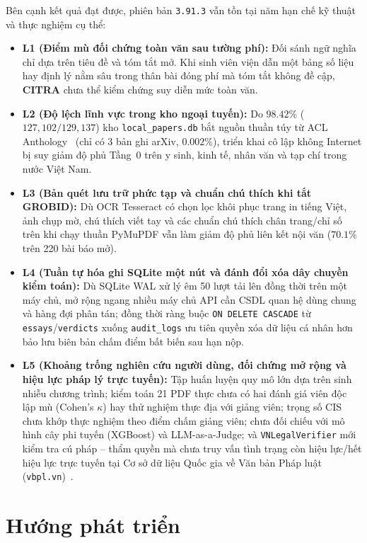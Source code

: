 Bên cạnh kết quả đạt được, phiên bản \texttt{3.91.3} vẫn tồn tại năm hạn chế kỹ thuật và thực nghiệm cụ thể:
{\setlength{\itemsep}{0pt}\setlength{\parskip}{0pt}
\begin{itemize}
    \item \textbf{L1 (Điểm mù đối chứng toàn văn sau tường phí):} Đối sánh ngữ nghĩa chỉ dựa trên tiêu đề và tóm tắt mở. Khi sinh viên viện dẫn một bảng số liệu hay định lý nằm sâu trong thân bài đóng phí mà tóm tắt không đề cập, \textbf{CITRA} chưa thể kiểm chứng suy diễn mức toàn văn.
    \item \textbf{L2 (Độ lệch lĩnh vực trong kho ngoại tuyến):} Do $98.42\%$ ($127{,}102 / 129{,}137$) kho \texttt{local\_papers.db} bắt nguồn thuần túy từ ACL Anthology~\cite{acl-anthology} (chỉ có 3 bản ghi arXiv, $0.002\%$), triển khai cô lập không Internet bị suy giảm độ phủ Tầng~0 trên y sinh, kinh tế, nhân văn và tạp chí trong nước Việt Nam.
    \item \textbf{L3 (Bản quét lưu trữ phức tạp và chuẩn chú thích khi tắt GROBID):} Dù OCR Tesseract có chọn lọc khôi phục trang in tiếng Việt, ảnh chụp mờ, chú thích viết tay và các chuẩn chú thích chân trang/chỉ số trên khi chạy thuần PyMuPDF vẫn làm giảm độ phủ liên kết nội văn ($70.1\%$ trên 220 bài báo mở).
    \item \textbf{L4 (Tuần tự hóa ghi SQLite một nút và đánh đổi xóa dây chuyền kiểm toán):} Dù SQLite WAL xử lý êm 50 lượt tải lên đồng thời trên một máy chủ, mở rộng ngang nhiều máy chủ API cần CSDL quan hệ dùng chung và hàng đợi phân tán; đồng thời ràng buộc \texttt{ON DELETE CASCADE} từ \texttt{essays}/\texttt{verdicts} xuống \texttt{audit\_logs} ưu tiên quyền xóa dữ liệu cá nhân hơn bảo lưu biên bản chấm điểm bất biến sau hạn nộp.
    \item \textbf{L5 (Khoảng trống nghiên cứu người dùng, đối chứng mở rộng và hiệu lực pháp lý trực tuyến):} Tập huấn luyện quy mô lớn dựa trên sinh nhiễu chương trình; kiểm toán 21 PDF thực chưa có hai đánh giá viên độc lập mù (Cohen's $\kappa$) hay thử nghiệm thực địa với giảng viên; trọng số CIS chưa khớp thực nghiệm theo điểm chấm giảng viên; chưa đối chiếu với mô hình cây phi tuyến (XGBoost) và LLM-as-a-Judge; và \texttt{VNLegalVerifier} mới kiểm tra cú pháp -- thẩm quyền mà chưa truy vấn tình trạng còn hiệu lực/hết hiệu lực trực tuyến tại Cơ sở dữ liệu Quốc gia về Văn bản Pháp luật (\texttt{vbpl.vn})~\cite{vbpl-vn}.
\end{itemize}}

\section{Hướng phát triển}
\label{sec:future-work}

